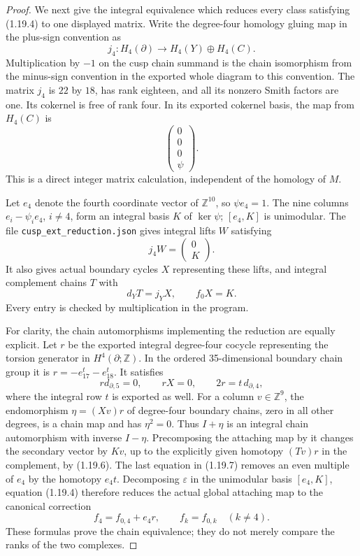 \begin{proof}
We next give the integral equivalence which reduces every class
satisfying (1.19.4) to one displayed matrix.  Write the degree-four
homology gluing map in the plus-sign convention as
\[
 j_4:H_4(\partial)\longrightarrow H_4(Y)\oplus H_4(C).
\]
Multiplication by $-1$ on the cusp chain summand is the chain
isomorphism from the minus-sign convention in the exported whole
diagram to this convention.  The matrix $j_4$ is $22$ by $18$,
has rank eighteen, and all its nonzero Smith factors are one.
Its cokernel is free of rank four. In its exported cokernel basis,
the map from $H_4(C)$ is
\[
 \begin{pmatrix}0\\0\\0\\\psi\end{pmatrix}.
\tag{1.19.5}
\]
This is a direct integer matrix calculation, independent of the
homology of $M$.

Let $e_4$ denote the fourth coordinate vector of $\mathbb Z^{10}$,
so $\psi e_4=1$.  The nine columns
$e_i-\psi_i e_4$, $i\ne4$, form an integral basis $K$ of $\ker\psi$;
$[e_4,K]$ is unimodular.  The file
\texttt{cusp\_ext\_reduction.json} gives integral lifts $W$ satisfying
\[
 j_4W=\begin{pmatrix}0\\K\end{pmatrix}.
\]
It also gives actual boundary cycles $X$ representing these lifts,
and integral complement chains $T$ with
\[
 d_YT=j_YX,\qquad f_0X=K.
\tag{1.19.6}
\]
Every entry is checked by multiplication in the program.

For clarity, the chain automorphisms implementing the reduction
are equally explicit.  Let $r$ be the exported integral degree-four
cocycle representing the torsion generator in $H^4(\partial;\mathbb Z)$.
In the ordered 35-dimensional boundary chain group it is
$r=-e_{17}^{t}-e_{18}^{t}$.  It satisfies
\[
 r d_{\partial,5}=0,\qquad rX=0,
 \qquad 2r=t\,d_{\partial,4},
\tag{1.19.7}
\]
where the integral row $t$ is exported as well.
For a column $v\in\mathbb Z^9$, the endomorphism
$\eta=(Xv)r$ of degree-four boundary chains, zero in all other
degrees, is a chain map and has $\eta^2=0$.
Thus $I+\eta$ is an integral chain automorphism with inverse
$I-\eta$. Precomposing the attaching map by it changes the
secondary vector by $Kv$, up to the explicitly given homotopy
$(Tv)r$ in the complement, by (1.19.6).
The last equation in (1.19.7) removes an even multiple of $e_4$
by the homotopy $e_4t$.  Decomposing $\varepsilon$ in the
unimodular basis $[e_4,K]$, equation (1.19.4) therefore reduces
the actual global attaching map to the canonical correction
\[
 f_4=f_{0,4}+e_4r,
 \qquad f_k=f_{0,k}\quad(k\ne4).
\tag{1.19.8}
\]
These formulas prove the chain equivalence; they do not merely
compare the ranks of the two complexes.


\end{proof}
